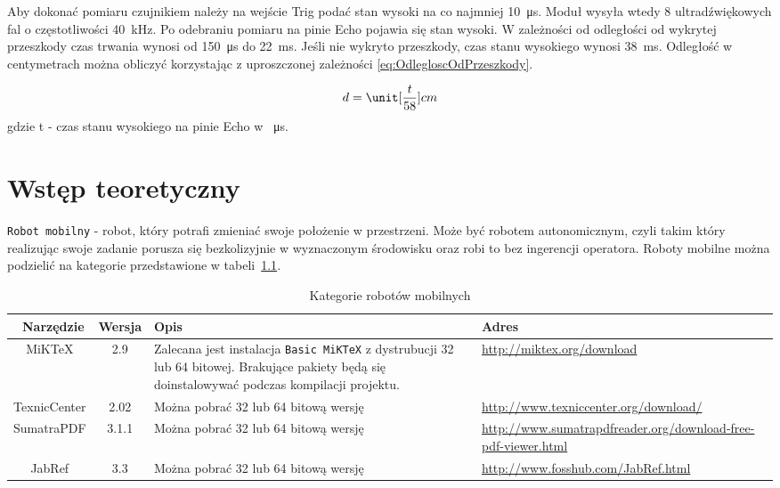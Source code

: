 	Aby dokonać pomiaru czujnikiem należy na wejście Trig podać stan wysoki na co najmniej \SI{10}{\micro\second}. Moduł wysyła wtedy 8 ultradźwiękowych fal o częstotliwości \SI{40}{\kilo\hertz}. Po odebraniu pomiaru na pinie Echo pojawia się stan wysoki. W zależności od odległości od wykrytej przeszkody czas trwania wynosi od \SI{150}{\micro\second} do \SI{22}{\milli\second}. Jeśli nie wykryto przeszkody, czas stanu wysokiego wynosi \SI{38}{\milli\second}. Odległość w centymetrach można obliczyć korzystając z uproszczonej zależności \ref{eq:OdlegloscOdPrzeszkody}.
	
	\begin{equation}\label{eq:OdlegloscOdPrzeszkody}
		d = \unit[\frac{t}{58}]{cm}
	\end{equation}
	gdzie t - czas stanu wysokiego na pinie Echo w \SI{}{\micro\second}.
	
\chapter{Wstęp teoretyczny}
\texttt{Robot mobilny} - robot, który potrafi zmieniać swoje położenie w przestrzeni. Może być robotem autonomicznym, czyli takim który realizując swoje zadanie porusza się bezkolizyjnie w wyznaczonym środowisku oraz robi to bez ingerencji operatora.
Roboty mobilne można podzielić na kategorie przedstawione w tabeli~\ref{tab:kategorieRobotow}.
\begin{table}[htb] \small
	\centering
	\caption{Kategorie robotów mobilnych}
	\label{tab:kategorieRobotow}
	\begin{tabularx}{\linewidth}{|c|c|X|p{6cm}|} \hline\
		Narzędzie & Wersja & Opis & Adres \\ \hline\hline
		MiKTeX & 2.9 & Zalecana jest instalacja \texttt{Basic MiKTeX} z dystrubucji 32 lub 64 bitowej. Brakujące pakiety będą się doinstalowywać podczas kompilacji projektu. &
		\url{http://miktex.org/download} \\ \hline
		TexnicCenter & 2.02 &  Można pobrać 32 lub 64 bitową wersję & \url{http://www.texniccenter.org/download/} \\ \hline
		SumatraPDF & 3.1.1 & Można pobrać 32 lub 64 bitową wersję & \url{http://www.sumatrapdfreader.org/download-free-pdf-viewer.html} \\ \hline
		JabRef & 3.3 & Można pobrać 32 lub 64 bitową wersję & \url{http://www.fosshub.com/JabRef.html} \\ \hline
	\end{tabularx}
\end{table}
